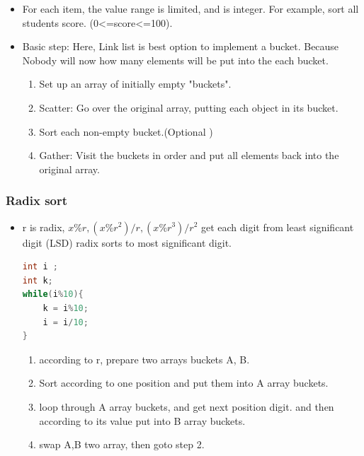 \documentclass[a4paper,11pt,twoside]{book}
\begin{document}
\begin{itemize}
\item For each item, the value range is limited, and is integer. For example, sort all students score. (0<=score<=100). 

\item Basic step:  Here, Link list is best option to implement a bucket. Because Nobody will now how many elements will be put into the each bucket. 
\begin{enumerate}
\item Set up an array of initially empty "buckets".
\item Scatter: Go over the original array, putting each object in its bucket. 
\item Sort each non-empty bucket.(Optional )
\item Gather: Visit the buckets in order and put all elements back into the original array.
\end{enumerate}

\end{itemize}

\subsubsection{Radix sort}

\begin{itemize}
\item r is radix, $x\%r, (x\%r^{2})/r, (x\%r^{3})/r^{2}$  get each digit from least significant digit (LSD) radix sorts to most significant digit. 

\begin{lstlisting}[frame=single, language=c++]
int i ;
int k;
while(i%10){
	k = i%10;
	i = i/10;
}
\end{lstlisting}

\begin{enumerate}
\item according to r, prepare two arrays buckets A, B. 
\item Sort according to one position and put them into A array buckets. 
\item loop through A array buckets, and get next position digit. and then according to its value put into B array buckets.
\item swap A,B two array, then goto step 2.
\end{enumerate}

\end{itemize}
\end{document}
